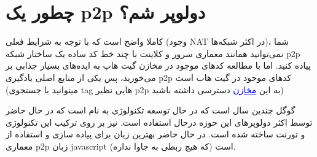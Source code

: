 \documentclass[]{article}
\begin{document}
\section*{{\titr  چطور یک p2p دولوپر شم؟}}

کاملا واضح است که با توجه به شرایط فعلی (وجود NAT در اکثر شبکه‌ها)، شما نمی‌توانید همانند معماری سرور و کلاینت با چند خط کد ساده یک ساختار شبکه p2p پیاده کنید. اما با مطالعه کد‌های موجود در مخازن گیت هاب به ایده‌های بسیار جذابی بر می‌خورید، پس یکی از منابع اصلی یادگیری p2p کدهای موجود در گیت هاب است (میتوانید با جستجوی tag هایی نظیر p2p به این \href{https://github.com/search?l=Java&q=p2p-network&type=Repositories}{\textcolor{blue}{\underline{مخازن}}}
 دسترسی داشته باشید) 


گوگل چندین سال است که در حال توسعه تکنولوژی به نام \href{https://webrtc.org/}{\textcolor{blue}{\underline{}}} است که در حال حاضر توسط اکثر دولوپر‌های این حوزه درحال استفاده است. \href{https://webtorrent.io/}{\textcolor{blue}{\underline{}}} نیز بر روی ترکیب این تکنولوژی و تورنت ساخته شده است. در حال حاضر بهترین زبان برای پیاده سازی و استفاده از معماری p2p زبان javascript (که هیچ ربطی به جاوا نداره) است.
\end{document}

